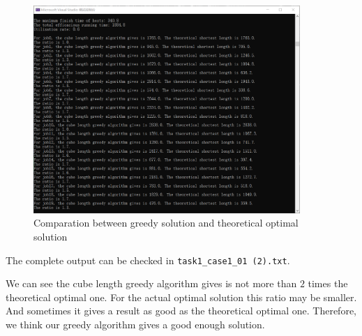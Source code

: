 \documentclass{llncs}
\begin{document}
	\begin{figure}[H]
		\begin{center}
			\includegraphics[width=0.9\textwidth]{Fig-task1-testforgreedy.png}
			\caption{Comparation between greedy solution and theoretical optimal solution}
			\label{Fig-task1-testforgreedy}
		\end{center}
	\end{figure}

	The complete output can be checked in \texttt{task1\_case1\_01 (2).txt}. 
	
	We can see the cube length greedy algorithm gives is not more than $2$ times the theoretical optimal one. For the actual optimal solution this ratio may be smaller. And sometimes it gives a result as good as the theoretical optimal one. Therefore, we think our greedy algorithm gives a good enough solution. 
	 
	
\end{document}

